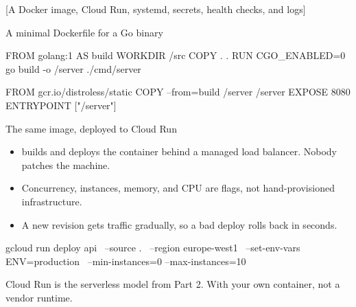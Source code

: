 \documentclass[10pt,aspectratio=169,t]{beamer}
\begin{document}
[A Docker image, Cloud Run, systemd, secrets, health checks, and logs]

\begin{frame}[fragile,eyebrow=Deploying]{A minimal Dockerfile for a Go binary}
\begin{codeblock}
FROM golang:1 AS build
WORKDIR /src
COPY . .
RUN CGO_ENABLED=0 go build -o /server ./cmd/server

FROM gcr.io/distroless/static
COPY --from=build /server /server
EXPOSE 8080
ENTRYPOINT ["/server"]
\end{codeblock}
  \vskip 2mm
\end{frame}

\begin{frame}[fragile,eyebrow=Deploying]{The same image, deployed to Cloud Run}
  \begin{itemize}
    \item {} builds and deploys the container behind a managed load balancer. Nobody patches the machine.
    \item Concurrency, instances, memory, and CPU are flags, not hand-provisioned infrastructure.
    \item A new revision gets traffic gradually, so a bad deploy rolls back in seconds.
  \end{itemize}
\begin{shell}
gcloud run deploy api \
  --source . \
  --region europe-west1 \
  --set-env-vars ENV=production \
  --min-instances=0 --max-instances=10
\end{shell}
  \begin{takeaway}{Cloud Run is the serverless model from Part 2.}
    With your own container, not a vendor runtime.
  \end{takeaway}
\end{frame}
\end{document}
